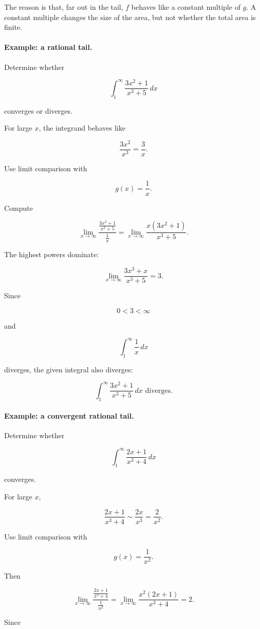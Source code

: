 The reason is that, far out in the tail, \(f\) behaves like a constant multiple of \(g\).  A
constant multiple changes the size of the area, but not whether the total area is finite.

\paragraph{Example: a rational tail.}
Determine whether

\[
\int_1^\infty \frac{3x^2+1}{x^3+5}\,dx
\]

converges or diverges.

For large \(x\), the integrand behaves like

\[
\frac{3x^2}{x^3}=\frac3x.
\]

Use limit comparison with

\[
g(x)=\frac1x.
\]

Compute

\[
\lim_{x\to\infty}
\frac{\frac{3x^2+1}{x^3+5}}{\frac1x}
=
\lim_{x\to\infty}
\frac{x(3x^2+1)}{x^3+5}.
\]

The highest powers dominate:

\[
\lim_{x\to\infty}
\frac{3x^3+x}{x^3+5}
=
3.
\]

Since

\[
0<3<\infty
\]

and

\[
\int_1^\infty \frac1x\,dx
\]

diverges, the given integral also diverges:

\[
\boxed{
\int_1^\infty \frac{3x^2+1}{x^3+5}\,dx
\text{ diverges.}
}
\]

\paragraph{Example: a convergent rational tail.}
Determine whether

\[
\int_1^\infty \frac{2x+1}{x^3+4}\,dx
\]

converges.

For large \(x\),

\[
\frac{2x+1}{x^3+4}
\sim
\frac{2x}{x^3}
=
\frac2{x^2}.
\]

Use limit comparison with

\[
g(x)=\frac1{x^2}.
\]

Then

\[
\lim_{x\to\infty}
\frac{\frac{2x+1}{x^3+4}}{\frac1{x^2}}
=
\lim_{x\to\infty}
\frac{x^2(2x+1)}{x^3+4}
=
2.
\]

Since

